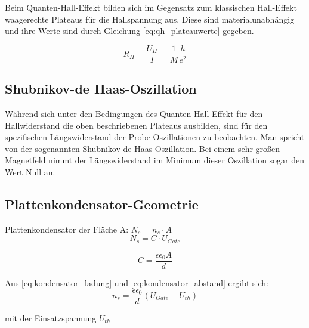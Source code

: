 Beim Quanten-Hall-Effekt bilden sich im Gegensatz zum klassischen Hall-Effekt waagerechte Plateaus für die Hallspannung aus. Diese sind materialunabhängig und ihre Werte sind durch Gleichung \ref{eq:qh_plateauwerte} gegeben. 


\begin{equation}
R_H=\frac{U_H}{I}=\frac{1}{M}\frac{h}{e^2}
\label{eq:U_Hall_simpel}
\end{equation}



\subsection{Shubnikov-de Haas-Oszillation}

Während sich unter den Bedingungen des Quanten-Hall-Effekt für den Hallwiderstand die oben beschriebenen Plateaus ausbilden, sind für den spezifischen Längswiderstand der Probe Oszillationen zu beobachten. Man spricht von der sogenannten Shubnikov-de Haas-Oszillation. Bei einem sehr großen Magnetfeld nimmt der Längswiderstand im Minimum dieser Oszillation sogar den Wert Null an.





\subsection{Plattenkondensator-Geometrie}

Plattenkondensator der Fläche A: $N_s=n_s \cdot A$ 
\begin{equation}
N_s=C \cdot U_{Gate}
\label{eq:kondensator_ladung}
\end{equation}

\begin{equation}
C=\frac{\epsilon \epsilon_0 A}{d}
\label{eq:kondensator_abstand}
\end{equation}


Aus \ref{eq:kondensator_ladung} und \ref{eq:kondensator_abstand} ergibt sich:
\begin{equation}
n_s=\frac{\epsilon \epsilon_0}{d}(U_{Gate}-U_{th})
\label{eq:kondens_lad_und_abst}
\end{equation}

mit der Einsatzspannung $U_{th}$


